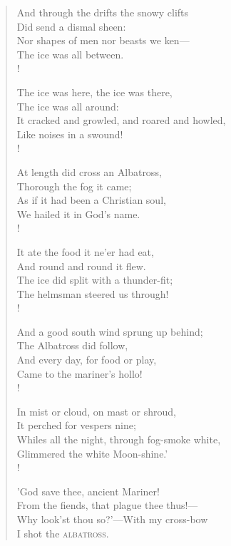 \documentclass[10pt,twoside]{memoir}
\begin{document}
\begin{verse}
And through the drifts the snowy clifts \\
Did send a dismal sheen: \\
Nor shapes of men nor beasts we ken— \\
The ice was all between. \\!

The ice was here, the ice was there, \\
The ice was all around: \\
It cracked and growled, and roared and howled, \\
Like noises in a swound! \\!

At length did cross an Albatross, \\
Thorough the fog it came; \\
As if it had been a Christian soul, \\
We hailed it in God's name. \\!

It ate the food it ne'er had eat, \\
And round and round it flew. \\
The ice did split with a thunder-fit; \\
The helmsman steered us through! \\!

And a good south wind sprung up behind; \\
The Albatross did follow, \\
And every day, for food or play, \\
Came to the mariner's hollo! \\!

In mist or cloud, on mast or shroud, \\
It perched for vespers nine; \\
Whiles all the night, through fog-smoke white, \\
Glimmered the white Moon-shine.' \\!

'God save thee, ancient Mariner! \\
From the fiends, that plague thee thus!— \\
Why look'st thou so?'—With my cross-bow \\
I shot the \textsc{albatross}.

\end{verse}
\end{document}

